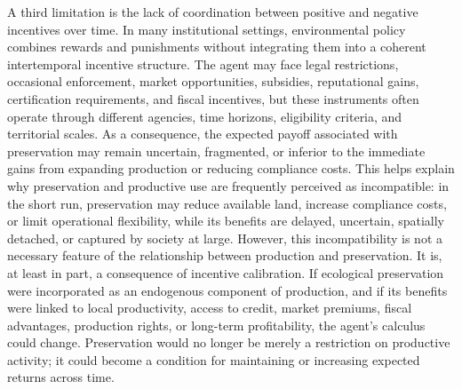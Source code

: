 A third limitation is the lack of coordination between positive and negative incentives over time. In many institutional settings, environmental policy combines rewards and punishments without integrating them into a coherent intertemporal incentive structure. The agent may face legal restrictions, occasional enforcement, market opportunities, subsidies, reputational gains, certification requirements, and fiscal incentives, but these instruments often operate through different agencies, time horizons, eligibility criteria, and territorial scales. As a consequence, the expected payoff associated with preservation may remain uncertain, fragmented, or inferior to the immediate gains from expanding production or reducing compliance costs. This helps explain why preservation and productive use are frequently perceived as incompatible: in the short run, preservation may reduce available land, increase compliance costs, or limit operational flexibility, while its benefits are delayed, uncertain, spatially detached, or captured by society at large. However, this incompatibility is not a necessary feature of the relationship between production and preservation. It is, at least in part, a consequence of incentive calibration. If ecological preservation were incorporated as an endogenous component of production, and if its benefits were linked to local productivity, access to credit, market premiums, fiscal advantages, production rights, or long-term profitability, the agent's calculus could change. Preservation would no longer be merely a restriction on productive activity; it could become a condition for maintaining or increasing expected returns across time.







